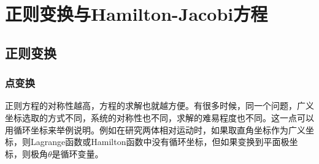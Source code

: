 \chapter{正则变换与Hamilton-Jacobi方程}

\section{正则变换}


\subsection{点变换}

正则方程的对称性越高，方程的求解也就越方便。有很多时候，同一个问题，广义坐标选取的方式不同，系统的对称性也不同，求解的难易程度也不同。这一点可以用循环坐标来举例说明。例如在研究两体相对运动时，如果取直角坐标作为广义坐标，则Lagrange函数或Hamilton函数中没有循环坐标，但如果变换到平面极坐标，则极角$\theta$是循环变量。

